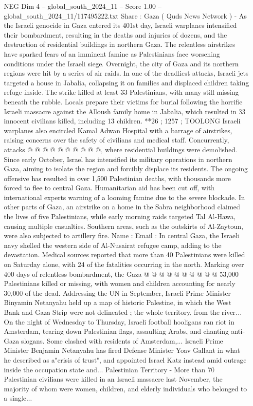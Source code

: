 \begin{textsample}{NEG Dim 4 – global\_south\_2024\_11 – Score 1.00 – global\_south\_2024\_11/117495222.txt}  \label{ex:f4_neg_180}
Share : Gaza ( Quds News Network ) - As the Israeli genocide in Gaza entered its 401st day, Israeli warplanes intensified their bombardment, resulting in the deaths and injuries of dozens, and the destruction of residential buildings in northern Gaza.
The relentless airstrikes have sparked fears of an imminent famine as Palestinians face worsening conditions under the Israeli siege.
Overnight, the city of Gaza and its northern regions were hit by a series of air raids.
In one of the deadliest attacks, Israeli jets targeted a house in Jabalia, collapsing it on families and displaced children taking refuge inside.
The strike killed at least 33 Palestinians, with many still missing beneath the rubble.
Locals prepare their victims for burial following the horrific Israeli massacre against the Alloush family home in Jabalia, which resulted in 33 innocent civilians killed, including 13 children. **26 ; 1257 ; TOOLONG Israeli warplanes also encircled Kamal Adwan Hospital with a barrage of airstrikes, raising concerns over the safety of civilians and medical staff.
Concurrently, attacks @ @ @ @ @ @ @ @ @ @, where residential buildings were demolished.
Since early October, Israel has intensified its military operations in northern Gaza, aiming to isolate the region and forcibly displace its residents.
The ongoing offensive has resulted in over 1,500 Palestinian deaths, with thousands more forced to flee to central Gaza.
Humanitarian aid has been cut off, with international experts warning of a looming famine due to the severe blockade.
In other parts of Gaza, an airstrike on a home in the Sabra neighborhood claimed the lives of five Palestinians, while early morning raids targeted Tal Al-Hawa, causing multiple casualties.
Southern areas, such as the outskirts of Al-Zaytoun, were also subjected to artillery fire.
Name : Email : In central Gaza, the Israeli navy shelled the western side of Al-Nusairat refugee camp, adding to the devastation.
Medical sources reported that more than 40 Palestinians were killed on Saturday alone, with 24 of the fatalities occurring in the north.
Marking over 400 days of relentless bombardment, the Gaza @ @ @ @ @ @ @ @ @ @ 53,000 Palestinians killed or missing, with women and children accounting for nearly 30,000 of the dead.
Addressing the UN in September, Israeli Prime Minister Binyamin Netanyahu held up a map of historic Palestine, in which the West Bank and Gaza Strip were not delineated ; the whole territory, from the river...
On the night of Wednesday to Thursday, Israeli football hooligans ran riot in Amsterdam, tearing down Palestinian flags, assaulting Arabs, and chanting anti-Gaza slogans.
Some clashed with residents of Amsterdam,...
Israeli Prime Minister Benjamin Netanyahu has fired Defense Minister Yoav Gallant in what he described as a"crisis of trust", and appointed Israel Katz instead amid outrage inside the occupation state and...
Palestinian Territory - More than 70 Palestinian civilians were killed in an Israeli massacre last November, the majority of whom were women, children, and elderly individuals who belonged to a single...

\end{textsample}
